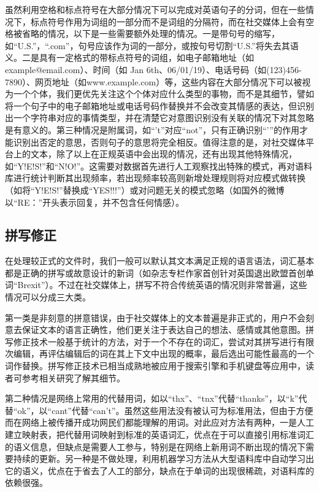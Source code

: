 虽然利用空格和标点符号在大部分情况下可以完成对英语句子的分词，但在一些情况下，标点符号作用为词组的一部分而不是词组的分隔符，而在社交媒体上会有空格被省略的情况，以下是一些需要额外处理的情况\cite{jackson2007natural}\cite{mitkov2004oxford}。一是带句号的缩写，如“U.S.”，“.com”，句号应该作为词的一部分，或按句号切割“U.S.”将失去其语义。二是具有一定格式的带标点符号的词组，如电子邮箱地址（如example@email.com）、时间（如 Jan 6th、06/01/19）、电话号码（如(123)456-7890）、网页地址（如www.example.com）等，这些内容在大部分情况下可以被视为一个个体，我们更优先关注这个个体对应什么类型的事物，而不是其细节，譬如将一个句子中的电子邮箱地址或电话号码作替换并不会改变其情感的表达，但识别出一个字符串对应的事情类型，并在清楚它对意图识别没有关联的情况下对其忽略是有意义的。第三种情况是附属词，如“'t”对应“not”，只有正确识别“'”的作用才能识别出否定的意思，否则句子的意思将完全相反。值得注意的是，对社交媒体平台上的文本，除了以上在正规英语中会出现的情况，还有出现其他特殊情况，如“Y!E!S!”和“N!O!”。这需要对数据首先进行人工观察找出特殊的模式，再对语料库进行统计判断其出现频率，若出现频率较高则新增处理规则将对应模式做转换（如将“Y!E!S!”替换成“YES!!!”）或对问题无关的模式忽略（如国外的微博以“RE：”开头表示回复，并不包含任何情感）。

\subsection{拼写修正}

在处理较正式的文件时，我们一般可以默认其文本满足正规的语言语法，词汇基本都是正确的拼写或故意设计的新词（如杂志专栏作家首创针对英国退出欧盟首创单词“Brexit”）。不过在社交媒体上，拼写不符合传统英语的情况则非常普遍，这些情况可以分成三大类。

第一类是非刻意的拼意错误，由于社交媒体上的文本普遍是非正式的，用户不会刻意去保证文本的语言正确性，他们更关注于表达自己的想法、感情或其他意图。拼写修正技术一般基于统计的方法，对于一个不存在的词汇，尝试对其拼写进行有限次编辑，再评估编辑后的词在其上下文中出现的概率，最后选出可能性最高的一个词作替换。拼写修正技术已相当成熟地被应用于搜索引擎和手机键盘等应用中，读者可参考相关研究\cite{ahmed2009revised}\cite{nejja2015context}了解其细节。

第二种情况是网络上常用的代替用词，如以“thx”、“tnx”代替“thanks”，以“k”代替“ok”，以“cant”代替“can't”。虽然这些用法没有被认可为标准用法，但由于方便而在网络上被传播开成功网民们都能理解的用词。对此应对方法有两种，一是人工建立映射表，把代替用词映射到标准的英语词汇，优点在于可以直接引用标准词汇的语义信息，但缺点是需要人工参与，特别是在网络上新用词不断出现的情况下需要持续的更新。另一种是不做处理，利用机器学习方法从大型语料库中自动学习出它的语义，优点在于省去了人工的部分，缺点在于单词的出现很稀疏，对语料库的依赖很强。

